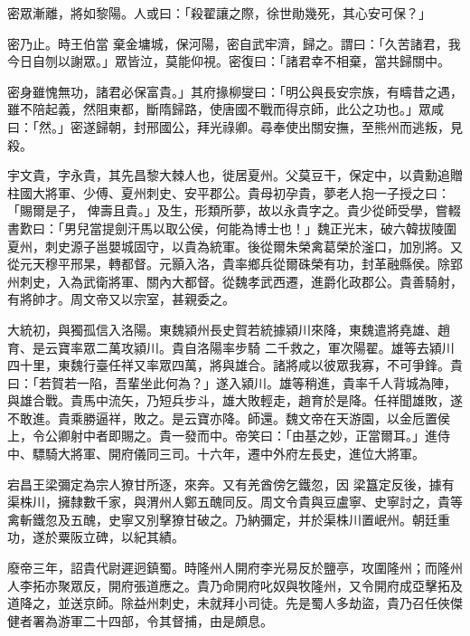 \begin{pinyinscope}
 密眾漸離，將如黎陽。人或曰：「殺翟讓之際，徐世勛幾死，其心安可保？」



 密乃止。時王伯當
 棄金墉城，保河陽，密自武牢濟，歸之。謂曰：「久苦諸君，我今日自刎以謝眾。」眾皆泣，莫能仰視。密復曰：「諸君幸不相棄，當共歸關中。



 密身雖愧無功，諸君必保富貴。」其府掾柳燮曰：「明公與長安宗族，有疇昔之遇，雖不陪起義，然阻東都，斷隋歸路，使唐國不戰而得京師，此公之功也。」眾咸曰：「然。」密遂歸朝，封邢國公，拜光祿卿。尋奉使出關安撫，至熊州而逃叛，見殺。



 宇文貴，字永貴，其先昌黎大棘人也，徙居夏州。父莫豆干，保定中，以貴勳追贈柱國大將軍、少傅、夏州刺史、安平郡公。貴母初孕貴，夢老人抱一子授之曰：「賜爾是子，
 俾壽且貴。」及生，形類所夢，故以永貴字之。貴少從師受學，嘗輟書歎曰：「男兒當提劍汗馬以取公侯，何能為博士也！」魏正光末，破六韓拔陵圍夏州，刺史源子邕嬰城固守，以貴為統軍。後從爾朱榮禽葛榮於滏口，加別將。又從元天穆平邢杲，轉都督。元顥入洛，貴率鄉兵從爾硃榮有功，封革融縣侯。除郢州刺史，入為武衛將軍、關內大都督。從魏孝武西遷，進爵化政郡公。貴善騎射，有將帥才。周文帝又以宗室，甚親委之。



 大統初，與獨孤信入洛陽。東魏潁州長史賀若統據潁川來降，東魏遣將堯雄、趙育、是云寶率眾二萬攻潁川。貴自洛陽率步騎
 二千救之，軍次陽翟。雄等去潁川四十里，東魏行臺任祥又率眾四萬，將與雄合。諸將咸以彼眾我寡，不可爭鋒。貴曰：「若賀若一陷，吾輩坐此何為？」遂入潁川。雄等稍進，貴率千人背城為陣，與雄合戰。貴馬中流矢，乃短兵步斗，雄大敗輕走，趙育於是降。任祥聞雄敗，遂不敢進。貴乘勝逼祥，敗之。是云寶亦降。師還。魏文帝在天游園，以金卮置侯上，令公卿射中者即賜之。貴一發而中。帝笑曰：「由基之妙，正當爾耳。」進侍中、驃騎大將軍、開府儀同三司。十六年，遷中外府左長史，進位大將軍。



 宕昌王梁彌定為宗人獠甘所逐，來奔。又有羌酋傍乞鐵忽，因
 梁簋定反後，據有渠株川，擁隸數千家，與渭州人鄭五醜同反。周文令貴與豆盧寧、史寧討之，貴等禽斬鐵忽及五醜，史寧又別擊獠甘破之。乃納彌定，并於渠株川置岷州。朝廷重功，遂於粟阪立碑，以紀其績。



 廢帝三年，詔貴代尉遲迥鎮蜀。時隆州人開府李光易反於鹽亭，攻圍隆州；而隆州人李拓亦聚眾反，開府張道應之。貴乃命開府叱奴與牧隆州，又令開府成亞擊拓及道降之，並送京師。除益州刺史，未就拜小司徒。先是蜀人多劫盜，貴乃召任俠傑健者署為游軍二十四部，令其督捕，由是頗息。




\end{pinyinscope}
